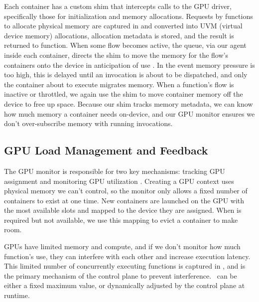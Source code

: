 Each container has a custom shim that intercepts calls to the GPU driver, specifically those for initialization and memory allocations.
Requests by functions to allocate physical memory are captured in and converted into UVM (virtual device memory) allocations, allocation metadata is stored, and the result is returned to function.
When some flow becomes active, the queue, via our agent inside each container, directs the shim to move the memory for the flow's containers onto the device in anticipation of use .
In the event memory pressure is too high, this is delayed until an invocation is about to be dispatched, and only the container about to execute migrates memory.
When a function's flow is inactive or throttled, we again use the shim to move container memory off the device to free up space.
Because our shim tracks memory metadata, we can know how much memory a container needs on-device, and our GPU monitor ensures we don't over-subscribe memory with running invocations.

\vspace*{\subsecspace}
\subsection{GPU Load Management and Feedback}
\label{sec:gpu-man}


The GPU monitor is responsible for two key mechanisms: tracking GPU assignment and monitoring GPU utilization .
Creating a GPU context uses physical memory we can't control, so the monitor only allows a fixed number of containers to exist at one time.
New containers are launched on the GPU with the most available slots and mapped to the device they are assigned.
When is required but not available, we use this mapping to evict a container to make room.

GPUs have limited memory and compute, and if we don't monitor how much function's use, they can interfere with each other and increase execution latency.
This limited number of concurrently executing functions is captured in \D, and is the primary mechanism of the control plane to prevent interference.
\D~can be either a fixed maximum value, or dynamically adjusted by the control plane at runtime.

